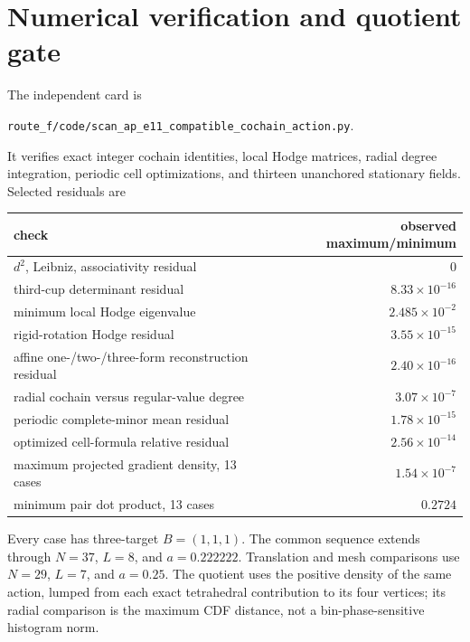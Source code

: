 \documentclass[11pt]{article}
\begin{document}
\section{Numerical verification and quotient gate}

The independent card is
\begin{center}
\texttt{route\_f/code/scan\_ap\_e11\_compatible\_cochain\_action.py}.
\end{center}
It verifies exact integer cochain identities, local Hodge matrices, radial
degree integration, periodic cell optimizations, and thirteen unanchored
stationary fields.  Selected residuals are
\begin{center}
\begin{tabular}{@{}lr@{}}
\toprule
check & observed maximum/minimum\\
\midrule
$d^2$, Leibniz, associativity residual & $0$\\
third-cup determinant residual & $8.33\times10^{-16}$\\
minimum local Hodge eigenvalue & $2.485\times10^{-2}$\\
rigid-rotation Hodge residual & $3.55\times10^{-15}$\\
affine one-/two-/three-form reconstruction residual & $2.40\times10^{-16}$\\
radial cochain versus regular-value degree & $3.07\times10^{-7}$\\
periodic complete-minor mean residual & $1.78\times10^{-15}$\\
optimized cell-formula relative residual & $2.56\times10^{-14}$\\
maximum projected gradient density, 13 cases & $1.54\times10^{-7}$\\
minimum pair dot product, 13 cases & $0.2724$\\
\bottomrule
\end{tabular}
\end{center}
Every case has three-target $B=(1,1,1)$.  The common sequence extends through
$N=37$, $L=8$, and $a=0.222222$.  Translation and mesh comparisons use
$N=29$, $L=7$, and $a=0.25$.  The quotient uses the positive density of the same
action, lumped from each exact tetrahedral contribution to its four vertices;
its radial comparison is the maximum CDF distance, not a bin-phase-sensitive
histogram norm.
\end{document}
